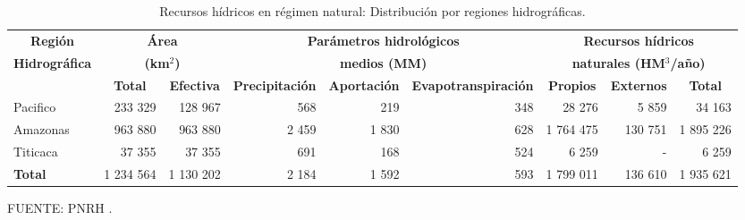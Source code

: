 \begin{sidewaystable}
\caption{Recursos hídricos en régimen natural: Distribución por regiones hidrográficas.}
\label{tab:RH_dist}
\centering
\begin{tabular}{lrrrrrrrr}
\hline
\multicolumn{1}{c}{\textbf{Región}}       & \multicolumn{2}{c}{\textbf{Área}}                                          & \multicolumn{3}{c}{\textbf{Parámetros hidrológicos}}                                                                   & \multicolumn{3}{c}{\textbf{Recursos hídricos}}                                                                    \\
\multicolumn{1}{c}{\textbf{Hidrográfica}} & \multicolumn{2}{c}{\textbf{(km$^2$)}}                                         & \multicolumn{3}{c}{\textbf{medios (MM)}}                                                                               & \multicolumn{3}{c}{\textbf{naturales (HM$^3$/año)}}                                                                   \\ \hline
\multicolumn{1}{c}{\textbf{}}             & \multicolumn{1}{c}{\textbf{Total}} & \multicolumn{1}{c}{\textbf{Efectiva}} & \multicolumn{1}{c}{\textbf{Precipitación}} & \multicolumn{1}{c}{\textbf{Aportación}} & \multicolumn{1}{c}{\textbf{Evapotranspiración}} & \multicolumn{1}{c}{\textbf{Propios}} & \multicolumn{1}{c}{\textbf{Externos}} & \multicolumn{1}{c}{\textbf{Total}} \\ \hline
Pacifico                                  & 233 329                            & 128 967                               & 568                                        & 219                                     & 348                             & 28 276                               & 5 859                                 & 34 163                             \\
Amazonas                                  & 963 880                            & 963 880                               & 2 459                                      & 1 830                                   & 628                             & 1 764 475                            & 130 751                               & 1 895 226                          \\
Titicaca                                  & 37 355                             & 37 355                                & 691                                        & 168                                     & 524                             & 6 259                                & -                                     & 6 259                              \\ \hline
\textbf{Total}                            & 1 234 564                          & 1 130 202                             & 2 184                                      & 1 592                                   & 593                             & 1 799 011                            & 136 610                               & 1 935 621                          \\ \hline
\end{tabular}
{\raggedright FUENTE: PNRH \citep{PNRH2013}. \par}

\end{sidewaystable}

